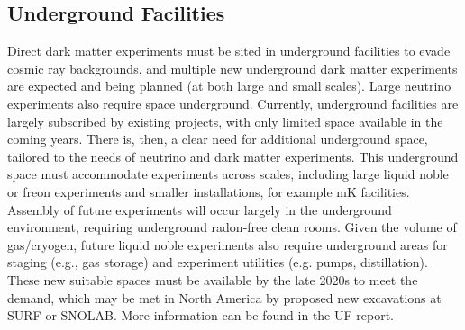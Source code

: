 \documentclass[nofootinbib]{article}
\begin{document}


\subsection{Underground Facilities}
Direct dark matter experiments must be sited in underground facilities to evade cosmic ray backgrounds, and multiple new underground dark matter experiments are expected and being planned (at both large and small scales). Large neutrino experiments also require space underground. Currently, underground facilities are largely subscribed by existing projects, with only limited space available in the coming years. There is, then, a clear need for additional underground space, tailored to the needs of neutrino and dark matter experiments.
This underground space must accommodate experiments across scales, including large liquid noble or freon experiments and smaller installations, for example mK facilities. Assembly of future experiments will occur largely in the underground environment, requiring underground radon-free clean rooms. Given the volume of gas/cryogen, future liquid noble experiments also require underground areas for staging (e.g., gas storage) and experiment utilities (e.g. pumps, distillation). These new suitable spaces must be available by the late 2020s to meet the demand, which may be met in North America by proposed new excavations at SURF or SNOLAB. More information can be found in the UF report.
\end{document}
